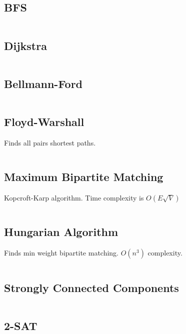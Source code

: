 \documentclass[8pt,a4paper,landscape,oneside]{amsart}
\newcommand{\code}[1]{\inputminted[fontsize=\normalsize,baselinestretch=1]{cpp}{_code/#1}}
\begin{document}
\begin{multicols*}{3}
	\subsection{BFS}

	\code{graphs/bfs.cpp}

	\subsection{Dijkstra}
	
	\code{graphs/dijkstra.cpp}

	\subsection{Bellmann-Ford}

	\code{graphs/bellman_ford.cpp}

	\subsection{Floyd-Warshall}
	
	Finds all pairs shortest paths.
	
	\code{graphs/floyd_warshall.cpp}

	\subsection{Maximum Bipartite Matching}
	
	Kopcroft-Karp algorithm. Time complexity is $O(E\sqrt{V})$
	
	\code{graphs/bipartite_matching.cpp}
	
	\subsection{Hungarian Algorithm}
	
	Finds min weight bipartite matching. $O(n^3)$ complexity.
	
	\code{graphs/hungarian_algorithm.cpp}
	
	\subsection{Strongly Connected Components}
	
	\code{graphs/strongly_connected_components.cpp}
	
	\subsection{2-SAT}
	

\end{multicols*}
\end{document}
